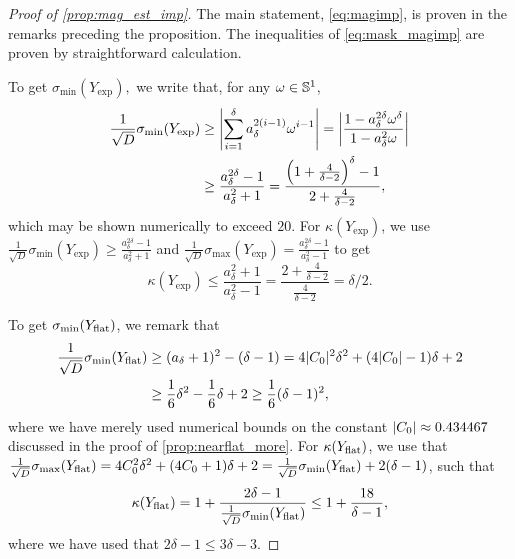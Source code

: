 \begin{proof}[Proof of \cref{prop:mag_est_imp}]
  The main statement, \eqref{eq:magimp}, is proven in the remarks preceding the proposition.  The inequalities of \eqref{eq:mask_magimp} are proven by straightforward calculation.

  To get $\sigma_{\min}(Y_{\exp}),$ we write that, for any $\omega \in \Sbb^1$,
  \begin{align*}
    \frac{1}{\sqrt{D}} \sigma_{\min}(Y_{\exp}) &\ge \abs*{\sum_{i = 1}^\delta a_\delta^{2(i - 1)} \omega^{i - 1}} = \abs*{\dfrac{1 - a_\delta^{2 \delta} \omega^\delta}{1 - a_\delta^2 \omega}} \\
    &\ge \dfrac{a_\delta^{2 \delta} - 1}{a_\delta^2 + 1} = \dfrac{\left(1 + \frac{4}{\delta - 2}\right)^\delta - 1}{2 + \frac{4}{\delta - 2}},\\    
  \end{align*}
  which may be shown numerically to exceed $20$.  For $\kappa(Y_{\exp})$, we use $\frac{1}{\sqrt{D}} \sigma_{\min}(Y_{\exp}) \ge \frac{a_\delta^{2 \delta} - 1}{a_\delta^2 + 1}$ and $\frac{1}{\sqrt{D}} \sigma_{\max}(Y_{\exp}) = \frac{a_\delta^{2 \delta} - 1}{a_\delta^2 - 1}$ to get \[\kappa(Y_{\exp}) \le \dfrac{a_\delta^2 + 1}{a_\delta^2 - 1} = \dfrac{2 + \frac{4}{\delta - 2}}{\frac{4}{\delta - 2}} = \delta / 2.\]

  To get $\sigma_{\min}(Y_{\rm flat})$, we remark that 
  \begin{align*}
    \frac{1}{\sqrt{D}} \sigma_{\min}(Y_{\rm flat}) &\ge (a_\delta + 1)^2 - (\delta - 1) = 4 \abs{C_0}^2 \delta^2 + (4 \abs{C_0} - 1) \delta + 2 \\
    &\ge \frac{1}{6} \delta^2 - \frac{1}{6} \delta + 2 \ge \frac{1}{6}(\delta - 1)^2,
  \end{align*}
  where we have merely used numerical bounds on the constant $\abs{C_0} \approx 0.434467$ discussed in the proof of \cref{prop:nearflat_more}.  For $\kappa(Y_{\rm flat})$, we use that $\frac{1}{\sqrt{D}} \sigma_{\max}(Y_{\rm flat}) = 4 C_0^2 \delta^2 + (4 C_0 + 1) \delta + 2 = \frac{1}{\sqrt{D}} \sigma_{\min}(Y_{\rm flat}) + 2 (\delta - 1)$, such that \[\kappa(Y_{\rm flat}) = 1 + \dfrac{2 \delta - 1}{\frac{1}{\sqrt{D}} \sigma_{\min}(Y_{\rm flat})} \le 1 + \dfrac{18}{\delta - 1},\] where we have used that $2 \delta - 1 \le 3 \delta - 3$.  
\end{proof}
